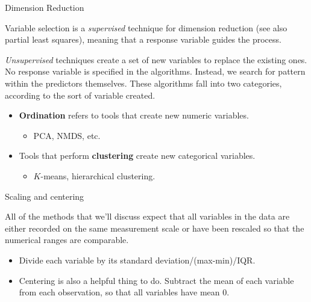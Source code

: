 \documentclass[
  ignorenonframetext,
]{beamer}
\providecommand{\tightlist}{%
  \setlength{\itemsep}{0pt}\setlength{\parskip}{0pt}}
\begin{document}
\begin{frame}{Dimension Reduction}
\protect\hypertarget{dimension-reduction}{}

Variable selection is a \emph{supervised} technique for dimension
reduction (see also partial least squares), meaning that a response
variable guides the process.

\emph{Unsupervised} techniques create a set of new variables to replace
the existing ones. No response variable is specified in the algorithms.
Instead, we search for pattern within the predictors themselves. These
algorithms fall into two categories, according to the sort of variable
created.

\begin{itemize}
\tightlist
\item
  \textbf{Ordination} refers to tools that create new numeric variables.

  \begin{itemize}
  \tightlist
  \item
    PCA, NMDS, etc.
  \end{itemize}
\item
  Tools that perform \textbf{clustering} create new categorical
  variables.

  \begin{itemize}
  \tightlist
  \item
    \(K\)-means, hierarchical clustering.
  \end{itemize}
\end{itemize}

\end{frame}

\begin{frame}{Scaling and centering}
\protect\hypertarget{scaling-and-centering}{}

All of the methods that we'll discuss expect that all variables in the
data are either recorded on the same measurement scale or have been
rescaled so that the numerical ranges are comparable.

\begin{itemize}
\tightlist
\item
  Divide each variable by its standard deviation/(max-min)/IQR.
\item
  Centering is also a helpful thing to do. Subtract the mean of each
  variable from each observation, so that all variables have mean 0.
\end{itemize}

\end{frame}
\end{document}
